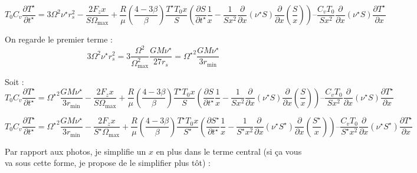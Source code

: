 \begin{equation}
    T_0 C_v \frac{\partial T^{\star}}{\partial t^{\star}} =
    3 \Omega^2 \nu^\star r_s^2 − \frac{2 F_z x}{S \Omega_\mathrm{max}} +
    \frac{R}{\mu} \left(\frac{4−3\beta}{\beta}\right) \frac{T^\star T_0 x}{S}
    \left( \frac{\partial S}{\partial t^\star} \frac{1}{x} − \frac{1}{S x^2} \frac{\partial}{\partial x} \left(\nu^\star S\right) \frac{\partial}{\partial x} \left(\frac{S}{x}\right) \right) –
    \frac{C_v T_0}{S x^2} \frac{\partial}{\partial x} \left(\nu^\star S\right) \frac{\partial T^\star}{\partial x}
\end{equation}

On regarde le premier terme :
\begin{equation}
    3 \Omega^2 \nu^\star r_s^2 = 3 \frac{\Omega^2}{\Omega_\mathrm{max}^2} \frac{G M \nu^\star}{27 r_s} = {\Omega^\star}^2 \frac{G M \nu^\star}{3 r_\mathrm{min}}
\end{equation}

Soit :
\begin{equation}
    T_0 C_v \frac{\partial T^{\star}}{\partial t^{\star}} =
    {\Omega^\star}^2 \frac{G M \nu^\star}{3 r_\mathrm{min}} − \frac{2 F_z x}{S \Omega_\mathrm{max}} +
    \frac{R}{\mu} \left(\frac{4−3\beta}{\beta}\right) \frac{T^\star T_0 x}{S}
    \left( \frac{\partial S}{\partial t^\star} \frac{1}{x} − \frac{1}{S x^2} \frac{\partial}{\partial x} \left(\nu^\star S\right) \frac{\partial}{\partial x} \left(\frac{S}{x}\right) \right) –
    \frac{C_v T_0}{S x^2} \frac{\partial}{\partial x} \left(\nu^\star S\right) \frac{\partial T^\star}{\partial x}
\end{equation}

\begin{equation}
    T_0 C_v \frac{\partial T^{\star}}{\partial t^{\star}} =
    {\Omega^\star}^2 \frac{G M \nu^\star}{3 r_\mathrm{min}} − \frac{2 F_z x}{S^\star \Omega_\mathrm{max}} +
    \frac{R}{\mu} \left(\frac{4−3\beta}{\beta}\right) \frac{T^\star T_0 x}{S^\star}
    \left( \frac{\partial S^\star}{\partial t^\star} \frac{1}{x} − \frac{1}{S^\star x^2} \frac{\partial}{\partial x} \left(\nu^\star S^\star\right) \frac{\partial}{\partial x} \left(\frac{S^\star}{x}\right) \right) –
    \frac{C_v T_0}{S^\star x^2} \frac{\partial}{\partial x} \left(\nu^\star S^\star\right) \frac{\partial T^\star}{\partial x}
\end{equation}

Par rapport aux photos, je simplifie un $x$ en plus dans le terme central (si ça vous va sous cette forme, je propose de le simplifier plus tôt) :

